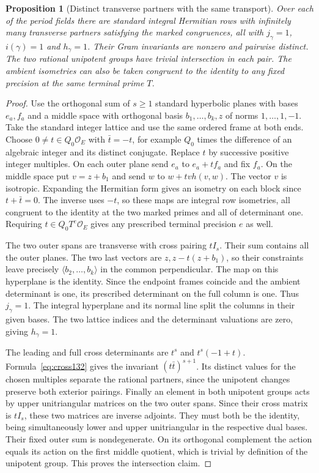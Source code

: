 \documentclass[a4paper,11pt]{article}
\newtheorem{proposition}{Proposition}[section]
\theoremstyle{definition}
\theoremstyle{remark}
\numberwithin{equation}{section}
\begin{document}
\begin{proposition}[Distinct transverse partners with the same transport]
\leavevmode\label{prop:repeatedtransport534}
Over each of the period fields there are standard integral
Hermitian rows with infinitely many transverse partners satisfying
the marked congruences, all with \(j_\gamma=1\), \(i(\gamma)=1\)
and \(h_\gamma=1\). Their Gram invariants are nonzero and
pairwise distinct. The two rational unipotent groups have trivial
intersection in each pair. The ambient isometries can also be
taken congruent to the identity to any fixed precision at the
same terminal prime \(T\).
\end{proposition}
\begin{proof}
Use the orthogonal sum of \(s\ge1\) standard hyperbolic planes
with bases \(e_a,f_a\) and a middle space with orthogonal basis
\(b_1,\ldots,b_k,z\) of norms \(1,\ldots,1,-1\). Take the
standard integer lattice and use the same ordered frame at both
ends. Choose \(0\ne t\in Q_0\mathcal O_E\) with \(\bar t=-t\),
for example \(Q_0\) times the difference of an algebraic integer
and its distinct conjugate. Replace \(t\) by successive positive
integer multiples. On each outer plane send \(e_a\) to
\(e_a+t f_a\) and fix \(f_a\). On the middle space put \(v=z+b_1\)
and send \(w\) to \(w+t v h(v,w)\). The vector \(v\) is isotropic.
Expanding the Hermitian form gives an isometry on each block
since \(t+\bar t=0\). The inverse uses \(-t\), so these maps are
integral row isometries, all congruent to the identity at the
two marked primes and all of determinant one. Requiring
\(t\in Q_0 T^e\mathcal O_E\) gives any prescribed terminal
precision \(e\) as well.

The two outer spans are transverse with cross pairing \(tI_s\).
Their sum contains all the outer planes. The two last vectors
are \(z,z-t(z+b_1)\), so their constraints leave precisely
\(\langle b_2,\ldots,b_k\rangle\) in the common perpendicular.
The map on this hyperplane is the identity. Since the endpoint
frames coincide and the ambient determinant is one, its prescribed
determinant on the full column is one. Thus \(j_\gamma=1\).
The integral hyperplane and its normal line split the columns
in their given bases. The two lattice indices and the determinant
valuations are zero, giving \(h_\gamma=1\).

The leading and full cross determinants are \(t^s\) and
\(t^s(-1+t)\). Formula~\eqref{eq:cross132} gives the invariant
\((t\bar t)^{s+1}\). Its distinct values for the chosen multiples
separate the rational partners, since the unipotent changes
preserve both exterior pairings. Finally an element in both
unipotent groups acts by upper unitriangular matrices on the two
outer spans. Since their cross matrix is \(tI_s\), these two
matrices are inverse adjoints. They must both be the identity,
being simultaneously lower and upper unitriangular in the
respective dual bases. Their fixed outer sum is nondegenerate.
On its orthogonal complement the action equals its action on
the first middle quotient, which is trivial by definition of
the unipotent group. This proves the intersection claim.
\end{proof}
\end{document}
